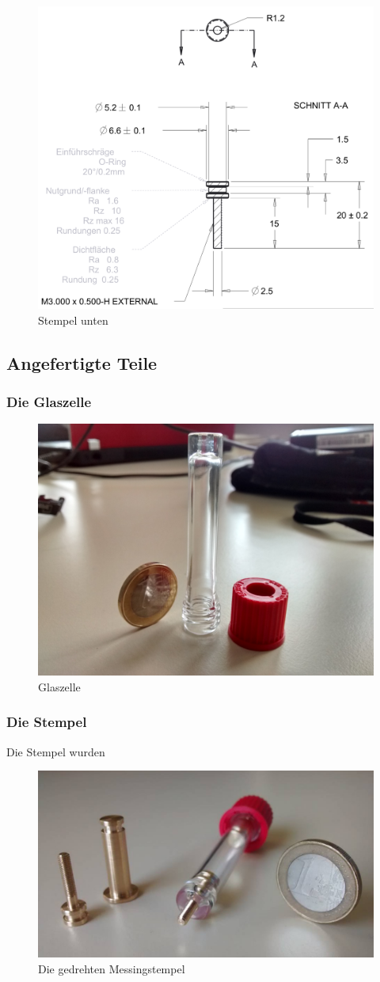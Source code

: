 \documentclass[a4paper, 11pt, headsepline,footsepline,twoside,abstract]{scrbook}
\begin{document}
\begin{figure}
	\centering
	\includegraphics[width=0.7\columnwidth]{images/stempel_unten.png}
	\caption{Stempel unten}
	\label{stempel_unten}
\end{figure}
\subsection{Angefertigte Teile}
\subsubsection{Die Glaszelle}
\begin{figure}
	\centering
	\includegraphics[width=0.6\columnwidth]{images/Glaszelle.jpg}
	\caption{Glaszelle}
	\label{glaszelle_foto}
\end{figure}
\subsubsection{Die Stempel}
Die Stempel wurden 
\begin{figure}
	\centering
	\includegraphics[width=0.9\columnwidth]{images/Stempel_Foto_cutted.jpg}
	\caption{Die gedrehten Messingstempel}
	\label{stempel_foto}
\end{figure}
\end{document}
